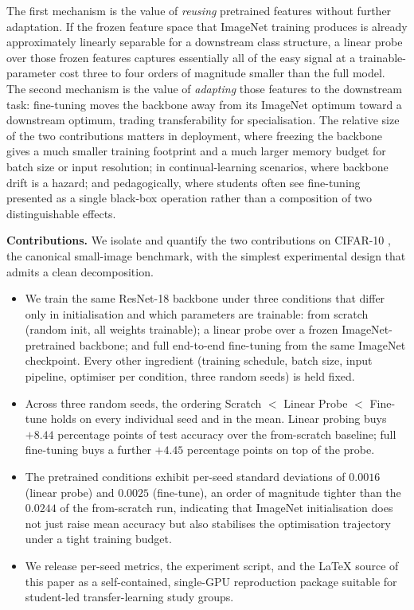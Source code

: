 \documentclass[11pt,twocolumn]{article}
\begin{document}
The first mechanism is the value of \emph{reusing} pretrained
features without further adaptation. If the frozen feature space that
ImageNet training produces is already approximately linearly
separable for a downstream class structure, a linear probe over those
frozen features captures essentially all of the easy signal at a
trainable-parameter cost three to four orders of magnitude smaller
than the full model. The second mechanism is the value of
\emph{adapting} those features to the downstream task: fine-tuning
moves the backbone away from its ImageNet optimum toward a downstream
optimum, trading transferability for specialisation. The relative
size of the two contributions matters in deployment, where freezing
the backbone gives a much smaller training footprint and a much
larger memory budget for batch size or input resolution; in
continual-learning scenarios, where backbone drift is a hazard; and
pedagogically, where students often see fine-tuning presented as a
single black-box operation rather than a composition of two
distinguishable effects.

\textbf{Contributions.} We isolate and quantify the two contributions
on CIFAR-10 \cite{krizhevsky2009learning}, the canonical small-image
benchmark, with the simplest experimental design that admits a clean
decomposition.
\begin{itemize}
  \item We train the same ResNet-18 \cite{he2016deep} backbone under
    three conditions that differ only in initialisation and which
    parameters are trainable: from scratch (random init, all weights
    trainable); a linear probe over a frozen ImageNet-pretrained
    backbone; and full end-to-end fine-tuning from the same
    ImageNet checkpoint. Every other ingredient (training schedule,
    batch size, input pipeline, optimiser per condition, three random
    seeds) is held fixed.
  \item Across three random seeds, the ordering Scratch $<$ Linear
    Probe $<$ Fine-tune holds on every individual seed and in the
    mean. Linear probing buys
    $+8.44$ percentage points of test
    accuracy over the from-scratch baseline; full fine-tuning buys a
    further $+4.45$ percentage points on top
    of the probe.
  \item The pretrained conditions exhibit per-seed standard
    deviations of $0.0016$ (linear probe) and $0.0025$
    (fine-tune), an order of magnitude tighter than the
    $0.0244$ of the from-scratch run, indicating
    that ImageNet initialisation does not just raise mean accuracy
    but also stabilises the optimisation trajectory under a tight
    training budget.
  \item We release per-seed metrics, the experiment script, and the
    LaTeX source of this paper as a self-contained, single-GPU
    reproduction package suitable for student-led
    transfer-learning study groups.
\end{itemize}
\end{document}
